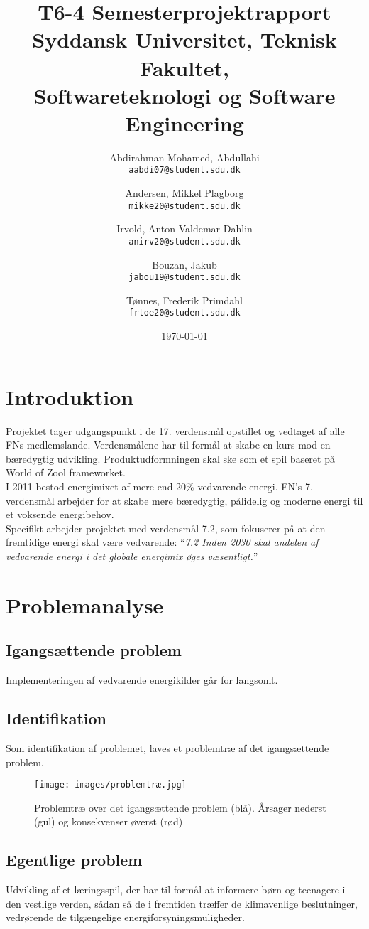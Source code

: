 \documentclass[a4paper,12pt]{report}
\title{T6-4 Semesterprojektrapport\\ \large Syddansk Universitet, Teknisk Fakultet,\\ Softwareteknologi og Software Engineering}
\author{
	Abdirahman Mohamed, Abdullahi\\
	\texttt{aabdi07@student.sdu.dk}
	\and
	Andersen, Mikkel Plagborg\\
	\texttt{mikke20@student.sdu.dk}
	\and
	Irvold, Anton Valdemar Dahlin\\
	\texttt{anirv20@student.sdu.dk}
	\and
	Bouzan, Jakub\\
	\texttt{jabou19@student.sdu.dk}
	\and
	Tønnes, Frederik Primdahl\\
	\texttt{frtoe20@student.sdu.dk}	 
}
\begin{document}
\date{\today}
\maketitle
\tableofcontents

\section{Introduktion}
Projektet tager udgangspunkt i de 17. verdensmål opstillet og vedtaget af alle FNs medlemslande. Verdensmålene har til formål at skabe en kurs mod en bæredygtig udvikling. Produktudformningen skal ske som et spil baseret på World of Zool frameworket.\\ 

I 2011 bestod energimixet af mere end 20\% vedvarende energi. FN’s 7. verdensmål arbejder for at skabe mere bæredygtig, pålidelig og moderne energi til et voksende energibehov.\\

Specifikt arbejder projektet med verdensmål 7.2, som fokuserer på at den fremtidige energi skal være vedvarende: “\textit{7.2 Inden 2030 skal andelen af vedvarende energi i det globale energimix øges væsentligt.}”\cite{verdensmaalene}

\section{Problemanalyse}
\subsection{Igangsættende problem}
Implementeringen af vedvarende energikilder går for langsomt.

\subsection{Identifikation}
Som identifikation af problemet, laves et problemtræ af det igangsættende problem.

\begin{figure}[h]
	\texttt{[image: images/problemtræ.jpg]}
	\caption{Problemtræ over det igangsættende problem (blå). Årsager nederst (gul) og 		konsekvenser øverst (rød)}
	\label{fig:problemtræ}
\end{figure}

\subsection{Egentlige problem}
Udvikling af et læringsspil, der har til formål at informere børn og teenagere i den vestlige verden, sådan så de i fremtiden træffer de klimavenlige beslutninger, vedrørende de tilgængelige energiforsyningsmuligheder.
\end{document}
